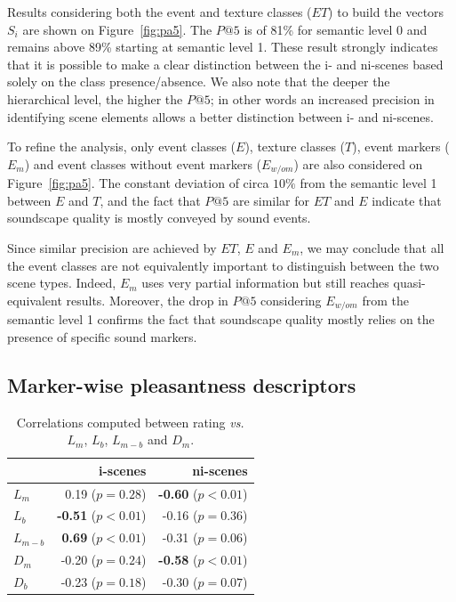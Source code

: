 \documentclass[twoside,twocolumn]{article}
\begin{document}
Results considering both the event and texture classes ($ET$)   to build the vectors  $S_i$ are shown on Figure~\ref{fig:pa5}. The $P@5$ is of 81\% for semantic level 0 and remains above 89\% starting at semantic level 1. These result strongly indicates that it is possible to make a clear distinction between the i- and ni-scenes based solely on the class presence/absence. We also note that the deeper the hierarchical level, the higher the $P@5$; in other words an increased precision in identifying scene elements allows a better distinction between i- and ni-scenes. 

To refine the analysis, only event classes ($E$), texture classes ($T$), event markers ($E_m$) and event classes without event markers ($E_{w/o m}$) are also considered on Figure~\ref{fig:pa5}. The constant deviation of circa $10\%$ from the semantic level 1 between $E$ and $T$, and the fact that $P@5$ are similar for $ET$ and $E$ indicate that soundscape quality is mostly conveyed by sound events.

Since similar precision are achieved by $ET$, $E$ and $E_m$, we may conclude that all the event classes are not equivalently important to distinguish between the two scene types. Indeed, $E_m$ uses very partial information but still reaches quasi-equivalent results. Moreover, the drop in $P@5$ considering $E_{w/o m}$ from the semantic level 1 confirms the fact that soundscape quality mostly relies on the presence of specific sound markers.


\subsection{Marker-wise pleasantness descriptors}
\label{sec:QuantifyingMarkers}

\begin{table}[t]
\centering
\begin{tabular}{l r r} 
                    &   i-scenes   & ni-scenes \\
\hline
$L_m$         & 0.19  ($p=0.28$)           & \textbf{-0.60} ($p<0.01$) \\
$L_b$         & \textbf{-0.51} ($p<0.01$)  & -0.16 ($p=0.36$) \\
$L_{m-b}$     & \textbf{0.69} ($p<0.01$)   & -0.31 ($p=0.06$) \\
$D_{m}$       & -0.20  ($p=0.24$)          & \textbf{-0.58} ($p<0.01$)  \\
$D_{b}$       & -0.23  ($p=0.18$)          & -0.30 ($p=0.07$)  \\
\hline
\end{tabular}
\vspace{0.5mm}
\caption{\label{tab:numMarkers} Correlations computed between rating \emph{vs.} $L_m$, $L_b$, $L_{m-b}$ and $D_m$.}
\end{table}
\end{document}
